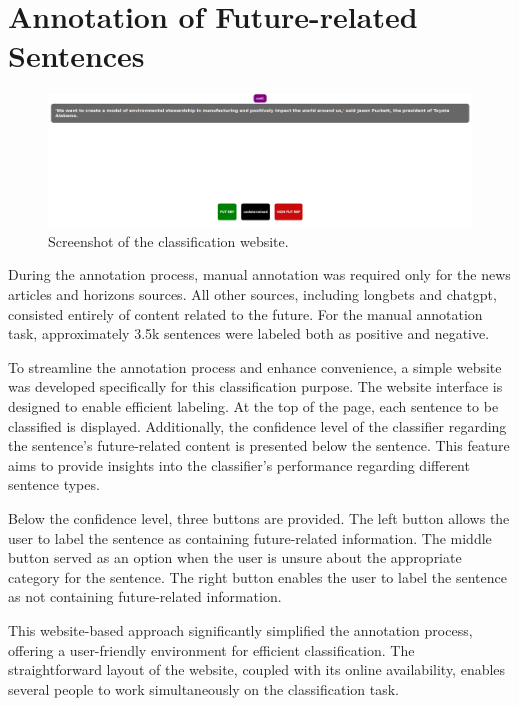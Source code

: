 \documentclass[a4paper,10pt]{report} %
\begin{document}
\section{Annotation of Future-related Sentences}
\begin{figure}
  \centering
  \includegraphics[width=16cm]{img/classification_website.png}
  \caption{Screenshot of the classification website.}
  \label{fig:classification_website}
\end{figure}
During the annotation process, manual annotation was required only for the news articles and horizons sources. All other sources, including longbets and chatgpt, consisted entirely of content related to the future. For the manual annotation task, approximately 3.5k sentences were labeled both as positive and negative.

To streamline the annotation process and enhance convenience, a simple website was developed specifically for this classification purpose. The website interface is designed to enable efficient labeling. At the top of the page, each sentence to be classified is displayed. Additionally, the confidence level of the classifier regarding the sentence's future-related content is presented below the sentence. This feature aims to provide insights into the classifier's performance regarding different sentence types.

Below the confidence level, three buttons are provided. The left button allows the user to label the sentence as containing future-related information. The middle button served as an option when the user is unsure about the appropriate category for the sentence. The right button enables the user to label the sentence as not containing future-related information.

This website-based approach significantly simplified the annotation process, offering a user-friendly environment for efficient classification. The straightforward layout of the website, coupled with its online availability, enables several people to work simultaneously on the classification task.
\end{document}

